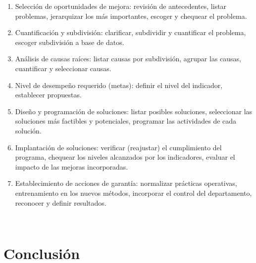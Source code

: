 {	\begin{enumerate}
	\item Selección de oportunidades de mejora: revisión de antecedentes, listar problemas, jerarquizar los más importantes, escoger y chequear el problema.
	\item Cuantificación y subdivisión: clarificar, subdividir y cuantificar el problema, escoger subdivisión a base de datos.
	\item Análisis de causas raíces: listar causas por subdivisión, agrupar las causas, cuantificar y seleccionar causas.
	\item Nivel de desempeño requerido (metas): definir el nivel del indicador, establecer propuestas.
	\item Diseño y programación de soluciones: listar posibles soluciones, seleccionar las soluciones más factibles y potenciales, programar las actividades de cada solución.
	\item Implantación de soluciones: verificar (reajustar) el cumplimiento del programa, chequear los niveles alcanzados por los indicadores, evaluar el impacto de las mejoras incorporadas.
	\item Establecimiento de acciones de garantía: normalizar prácticas operativas, entrenamiento en los nuevos métodos, incorporar el control del departamento, reconocer y definir resultados.
	\end{enumerate}
	
	
	\\\newpage

\section{Conclusión}

	\\
	
}
